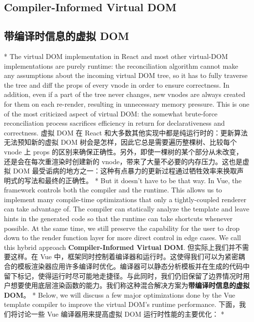 \begin{paracol}{2}
\subsection{Compiler-Informed Virtual DOM}
\switchcolumn
\subsection{带编译时信息的虚拟 DOM}
\switchcolumn[0]*%
The virtual DOM implementation in React and most other virtual-DOM
implementations are purely runtime: the reconciliation algorithm cannot
make any assumptions about the incoming virtual DOM tree, so it has to
fully traverse the tree and diff the props of every vnode in order to
ensure correctness. In addition, even if a part of the tree never
changes, new vnodes are always created for them on each re-render,
resulting in unnecessary memory pressure. This is one of the most
criticized aspect of virtual DOM: the somewhat brute-force
reconciliation process sacrifices efficiency in return for
declarativeness and correctness.
\switchcolumn
虚拟 DOM 在 React
和大多数其他实现中都是纯运行时的：更新算法无法预知新的虚拟 DOM
树会是怎样，因此它总是需要遍历整棵树、比较每个 vnode 上 props
的区别来确保正确性。另外，即使一棵树的某个部分从未改变，还是会在每次重渲染时创建新的
vnode，带来了大量不必要的内存压力。这也是虚拟 DOM
最受诟病的地方之一：这种有点暴力的更新过程通过牺牲效率来换取声明式的写法和最终的正确性。
\switchcolumn[0]*%
But it doesn't have to be that way. In Vue, the framework controls both
the compiler and the runtime. This allows us to implement many
compile-time optimizations that only a tightly-coupled renderer can take
advantage of. The compiler can statically analyze the template and leave
hints in the generated code so that the runtime can take shortcuts
whenever possible. At the same time, we still preserve the capability
for the user to drop down to the render function layer for more direct
control in edge cases. We call this hybrid approach
\textbf{Compiler-Informed Virtual DOM}.
\switchcolumn
但实际上我们并不需要这样。在 Vue
中，框架同时控制着编译器和运行时。这使得我们可以为紧密耦合的模板渲染器应用许多编译时优化。编译器可以静态分析模板并在生成的代码中留下标记，使得运行时尽可能地走捷径。与此同时，我们仍旧保留了边界情况时用户想要使用底层渲染函数的能力。我们称这种混合解决方案为\textbf{带编译时信息的虚拟
DOM}。
\switchcolumn[0]*%
Below, we will discuss a few major optimizations done by the Vue
template compiler to improve the virtual DOM's runtime performance.
\switchcolumn
下面，我们将讨论一些 Vue 编译器用来提高虚拟 DOM 运行时性能的主要优化：
\switchcolumn[0]*%

\end{paracol}
